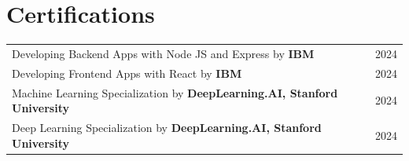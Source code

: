 \documentclass[a4paper,9pt]{extarticle}
\begin{document}

\section{Certifications}
\begin{tabularx}{\linewidth}{@{}X r@{}}
Developing Backend Apps with Node JS and Express by \textbf{IBM} & 2024 \\

Developing Frontend Apps with React by \textbf{IBM} & 2024 \\

Machine Learning Specialization by \textbf{DeepLearning.AI, Stanford University} & 2024 \\

Deep Learning Specialization by \textbf{DeepLearning.AI, Stanford University} & 2024 \\
\end{tabularx}












\vfill
\end{document}
